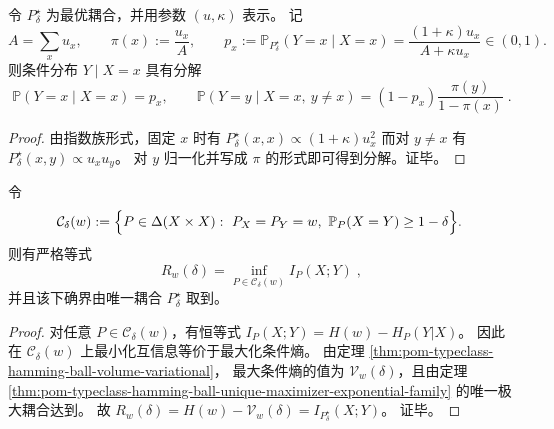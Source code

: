 \begin{theorem}\label{thm:pom-typeclass-keep-resample-channel}
令 \(P^\star_\delta\) 为最优耦合，并用参数 \((u,\kappa)\) 表示。
记
\[
A=\sum_x u_x,\qquad \pi(x):=\frac{u_x}{A},
\qquad
p_x:=\mathbb P_{P^\star_\delta}(Y=x\mid X=x)=\frac{(1+\kappa)u_x}{A+\kappa u_x}\in(0,1).
\]
则条件分布 \(Y\mid X=x\) 具有分解
\[
\boxed{\;
\mathbb P(Y=x\mid X=x)=p_x,\qquad
\mathbb P(Y=y\mid X=x,\ y\neq x)=(1-p_x)\frac{\pi(y)}{1-\pi(x)}\; }.
\]
\end{theorem}
\begin{proof}
由指数族形式，固定 \(x\) 时有
\(
P^\star_\delta(x,x)\propto (1+\kappa)u_x^2
\)
而对 \(y\neq x\) 有
\(
P^\star_\delta(x,y)\propto u_xu_y
\)。
对 \(y\) 归一化并写成 \(\pi\) 的形式即可得到分解。证毕。
\end{proof}

\begin{theorem}\label{thm:pom-typeclass-rate-distortion-mutual-information}
令
\[
\mathcal C_\delta(w):=\Bigl\{P\in\Delta(X\times X):\ P_X=P_Y=w,\ \mathbb P_P(X=Y)\ge 1-\delta\Bigr\}.
\]
则有严格等式
\[
\boxed{\;
R_w(\delta)=\inf_{P\in\mathcal C_\delta(w)} I_P(X;Y)\; } ,
\]
并且该下确界由唯一耦合 \(P^\star_\delta\) 取到。
\end{theorem}
\begin{proof}
对任意 \(P\in\mathcal C_\delta(w)\)，有恒等式
\(
I_P(X;Y)=H(w)-H_P(Y|X)
\)。
因此在 \(\mathcal C_\delta(w)\) 上最小化互信息等价于最大化条件熵。
由定理 \ref{thm:pom-typeclass-hamming-ball-volume-variational}，
最大条件熵的值为 \(\mathcal V_w(\delta)\)，且由定理 \ref{thm:pom-typeclass-hamming-ball-unique-maximizer-exponential-family} 的唯一极大耦合达到。
故
\(
R_w(\delta)=H(w)-\mathcal V_w(\delta)=I_{P^\star_\delta}(X;Y)
\)。
证毕。
\end{proof}

